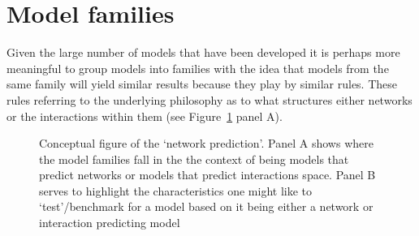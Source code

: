 \documentclass[
  letterpaper,
  DIV=11,
  numbers=noendperiod]{scrartcl}
\begin{document}
\section{Model families}\label{model-families}

Given the large number of models that have been developed it is perhaps
more meaningful to group models into families with the idea that models
from the same family will yield similar results because they play by
similar rules. These rules referring to the underlying philosophy as to
what structures either networks or the interactions within them (see
Figure~\ref{fig-concept} panel A).

\begin{figure}


\caption{\label{fig-concept}Conceptual figure of the `network
prediction'. Panel A shows where the model families fall in the the
context of being models that predict networks or models that predict
interactions space. Panel B serves to highlight the characteristics one
might like to `test'/benchmark for a model based on it being either a
network or interaction predicting model}

\end{figure}%
\end{document}
